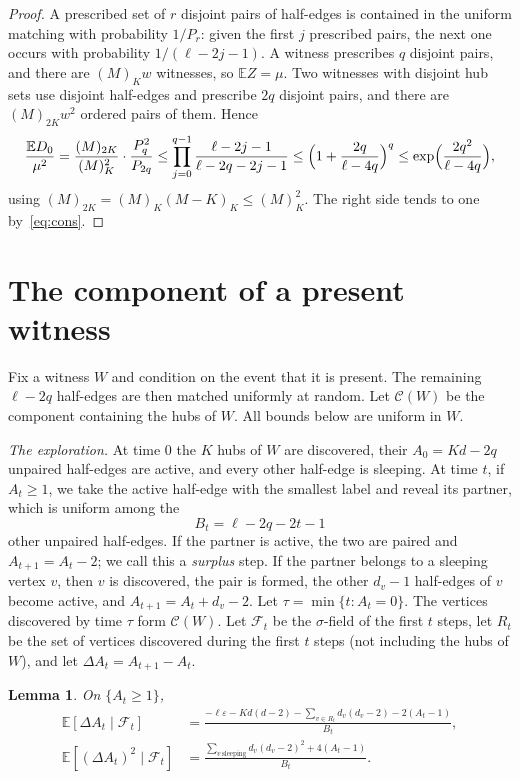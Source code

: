 \documentclass[11pt]{amsart}
\newtheorem{lemma}[theorem]{Lemma}
\theoremstyle{definition}
\theoremstyle{remark}
\numberwithin{equation}{section}
\newcommand{\E}{\mathbb E}
\newcommand{\eps}{\varepsilon}
\newcommand{\cF}{\mathcal F}
\newcommand{\cC}{\mathcal C}
\begin{document}
\begin{proof}
A prescribed set of $r$ disjoint pairs of half-edges is contained in the uniform matching with probability $1/P_r$: given the first $j$ prescribed pairs, the next one occurs with probability $1/(\ell-2j-1)$. A witness prescribes $q$ disjoint pairs, and there are $(M)_Kw$ witnesses, so $\E Z=\mu$. Two witnesses with disjoint hub sets use disjoint half-edges and prescribe $2q$ disjoint pairs, and there are $(M)_{2K}w^2$ ordered pairs of them. Hence
\[
\frac{\E D_0}{\mu^2}=\frac{(M)_{2K}}{(M)_K^2}\cdot\frac{P_q^2}{P_{2q}}\le\prod_{j=0}^{q-1}\frac{\ell-2j-1}{\ell-2q-2j-1}\le\Bigl(1+\frac{2q}{\ell-4q}\Bigr)^{q}\le\exp\Bigl(\frac{2q^2}{\ell-4q}\Bigr),
\]
using $(M)_{2K}=(M)_K(M-K)_K\le(M)_K^2$. The right side tends to one by~\eqref{eq:cons}.
\end{proof}

\section{The component of a present witness}

Fix a witness $W$ and condition on the event that it is present. The remaining $\ell-2q$ half-edges are then matched uniformly at random. Let $\cC(W)$ be the component containing the hubs of $W$. All bounds below are uniform in $W$.

\smallskip\noindent\emph{The exploration.} At time $0$ the $K$ hubs of $W$ are discovered, their $A_0=Kd-2q$ unpaired half-edges are active, and every other half-edge is sleeping. At time $t$, if $A_t\ge1$, we take the active half-edge with the smallest label and reveal its partner, which is uniform among the
\[
B_t=\ell-2q-2t-1
\]
other unpaired half-edges. If the partner is active, the two are paired and $A_{t+1}=A_t-2$; we call this a \emph{surplus} step. If the partner belongs to a sleeping vertex $v$, then $v$ is discovered, the pair is formed, the other $d_v-1$ half-edges of $v$ become active, and $A_{t+1}=A_t+d_v-2$. Let $\tau=\min\{t:A_t=0\}$. The vertices discovered by time $\tau$ form $\cC(W)$. Let $\cF_t$ be the $\sigma$-field of the first $t$ steps, let $R_t$ be the set of vertices discovered during the first $t$ steps (not including the hubs of $W$), and let $\Delta A_t=A_{t+1}-A_t$.

\begin{lemma}\label{lem:drift}
On $\{A_t\ge1\}$,
\begin{align}
\E[\Delta A_t\mid\cF_t]&=\frac{-\ell\eps-Kd(d-2)-\sum_{v\in R_t}d_v(d_v-2)-2(A_t-1)}{B_t},\label{eq:driftA}\\
\E[(\Delta A_t)^2\mid\cF_t]&=\frac{\sum_{v\ \mathrm{sleeping}}d_v(d_v-2)^2+4(A_t-1)}{B_t}.\label{eq:varA}
\end{align}
\end{lemma}
\end{document}
